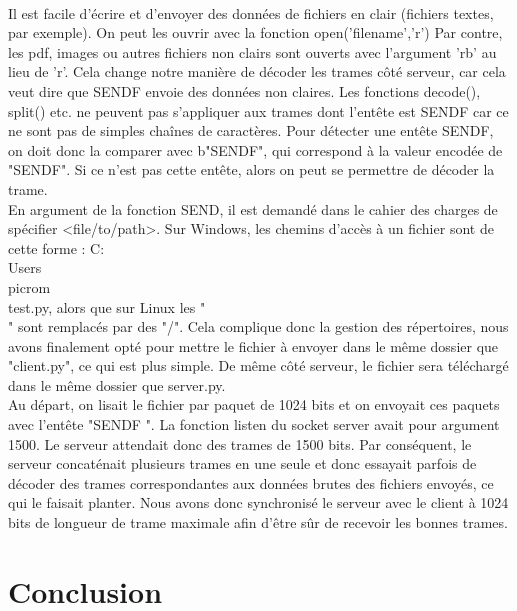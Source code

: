 \documentclass[12pt]{article}
\begin{document}
{
\\
Il est facile d'écrire et d'envoyer des données de fichiers en clair (fichiers textes, par exemple). On peut les ouvrir avec la fonction open('filename','r')
Par contre, les pdf, images ou autres fichiers non clairs sont ouverts avec l'argument 'rb' au lieu de 'r'.
Cela change notre manière de décoder les trames côté serveur, car cela veut dire que SENDF envoie des données non claires.
Les fonctions decode(), split() etc. ne peuvent pas s'appliquer aux trames dont l'entête est SENDF car ce ne sont pas de simples chaînes de caractères.
Pour détecter une entête SENDF, on doit donc la comparer avec b"SENDF", qui correspond à la valeur encodée de "SENDF". Si ce n'est pas cette entête, alors on peut se permettre de décoder la trame.
\\
En argument de la fonction SEND, il est demandé dans le cahier des charges de spécifier <file/to/path>.
Sur Windows, les chemins d'accès à un fichier sont de cette forme : C:\\Users\\picrom\\test.py, alors que sur Linux les "\\" sont remplacés par des "/".
Cela complique donc la gestion des répertoires, nous avons finalement opté pour mettre le fichier à envoyer dans le même dossier que "client.py", ce qui est plus simple.
De même côté serveur, le fichier sera téléchargé dans le même dossier que server.py.
\\
Au départ, on lisait le fichier par paquet de 1024 bits et on envoyait ces paquets avec l'entête "SENDF ".
La fonction listen du socket server avait pour argument 1500. Le serveur attendait donc des trames de 1500 bits.
Par conséquent, le serveur concaténait plusieurs trames en une seule et donc essayait parfois de décoder des trames correspondantes aux données brutes des fichiers envoyés, ce qui le faisait planter.
Nous avons donc synchronisé le serveur avec le client à 1024 bits de longueur de trame maximale afin d'être sûr de recevoir les bonnes trames.


\section{Conclusion}

}
\end{document}
